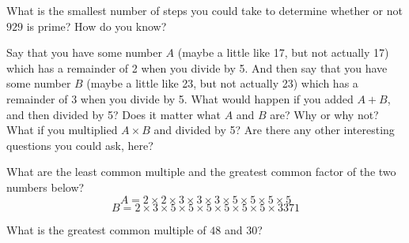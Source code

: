 \documentclass{ximera}
\begin{document}
\begin{problem}
What is the smallest number of steps you could take to determine whether or not $929$ is prime? How do you know?
\vskip 0.5in
\end{problem}



\begin{problem}
Say that you have some number $A$ (maybe a little like 17, but not actually 17) which has a remainder of 2 when you divide by 5. And then say that you have some number $B$ (maybe a little like 23, but not actually 23) which has a remainder of 3 when you divide by 5. What would happen if you added $A+B$, and then divided by 5? Does it matter what $A$ and $B$ are? Why or why not? What if you multiplied $A\times B$ and divided by 5? Are there any other interesting questions you could ask, here?
\vskip 0.5in
\end{problem}


\begin{problem}
What are the least common multiple and the greatest common factor of the two numbers below?
\[
A = 2 \times 2 \times 3 \times 3 \times 3 \times 5 \times 5 \times 5 \times 5
\]
\[
B = 2 \times 3 \times 5 \times 5 \times 5 \times 5 \times 5 \times 5 \times 3371
\]
\vskip 0.5in
\end{problem}



\begin{problem}
What is the greatest common multiple of $48$ and $30$?
\vskip 0.5in
\end{problem}
\end{document}
